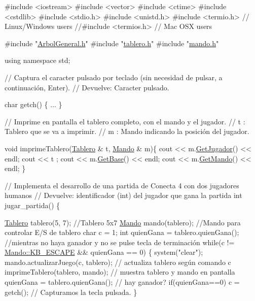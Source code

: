 \begin{DoxyCode}
\textcolor{preprocessor}{#include <iostream>}
\textcolor{preprocessor}{#include <vector>}
\textcolor{preprocessor}{#include <ctime>}
\textcolor{preprocessor}{#include <cstdlib>}
\textcolor{preprocessor}{#include <stdio.h>}
\textcolor{preprocessor}{#include <unistd.h>}
\textcolor{preprocessor}{#include <termio.h>}         \textcolor{comment}{// Linux/Windows users}
\textcolor{comment}{//#include <termios.h>      // Mac OSX users}

\textcolor{preprocessor}{#include "\hyperlink{ArbolGeneral_8h}{ArbolGeneral.h}"}
\textcolor{preprocessor}{#include "\hyperlink{tablero_8h}{tablero.h}"}
\textcolor{preprocessor}{#include "\hyperlink{mando_8h}{mando.h}"}

\textcolor{keyword}{using namespace }std;

\textcolor{comment}{// Captura el caracter pulsado por teclado (sin necesidad de pulsar, a continuación, Enter).}
\textcolor{comment}{// Devuelve: Caracter pulsado.}

\textcolor{keywordtype}{char} getch() \{
 ...
\}

\textcolor{comment}{// Imprime en pantalla el tablero completo, con el mando y el jugador.}
\textcolor{comment}{// t : Tablero que se va a imprimir.}
\textcolor{comment}{// m : Mando indicando la posición del jugador.}

\textcolor{keywordtype}{void} imprimeTablero(\hyperlink{classTablero}{Tablero} & t, \hyperlink{classMando}{Mando} & m)\{
    cout << m.\hyperlink{classMando_aaf8c918ecbce5c8173fcf40e04c8b0b7}{GetJugador}() << endl;
    cout << t ;
    cout << m.\hyperlink{classMando_abcc813b0881e56ed976eea2ce6b7fd12}{GetBase}() << endl;
    cout << m.\hyperlink{classMando_a7e02a04343208f949a88e720ba63a281}{GetMando}() << endl;
\}


\textcolor{comment}{// Implementa el desarrollo de una partida de Conecta 4 con dos jugadores humanos}
\textcolor{comment}{// Devuelve: identificador (int) del jugador que gana la partida}
\textcolor{keywordtype}{int} jugar\_partida() \{

    \hyperlink{classTablero}{Tablero} tablero(5, 7);      \textcolor{comment}{//Tablero 5x7}
    \hyperlink{classMando}{Mando} mando(tablero);       \textcolor{comment}{//Mando para controlar E/S de tablero}
    \textcolor{keywordtype}{char} c = 1;
    \textcolor{keywordtype}{int} quienGana = tablero.quienGana();
    \textcolor{comment}{//mientras no haya ganador y no se pulse tecla de terminación}
    \textcolor{keywordflow}{while}(c != \hyperlink{classMando_a3c4e7465d5b25fcaf8f3b50b444421a3}{Mando::KB\_ESCAPE} && quienGana == 0) \{
        system(\textcolor{stringliteral}{"clear"});
        mando.actualizarJuego(c, tablero);  \textcolor{comment}{// actualiza tablero según comando c }
        imprimeTablero(tablero, mando);     \textcolor{comment}{// muestra tablero y mando en pantalla}
        quienGana = tablero.quienGana();    \textcolor{comment}{// hay ganador?}
        \textcolor{keywordflow}{if}(quienGana==0) c = getch();       \textcolor{comment}{// Capturamos la tecla pulsada.    }
    \}


\end{DoxyCode}
